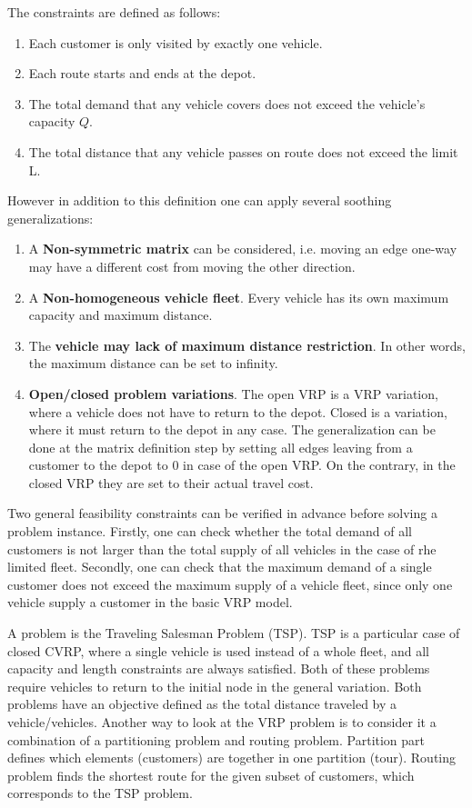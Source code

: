 \documentclass[12pt,a4paper,oneside]{book}
\begin{document}
The constraints are defined as follows:
\begin{enumerate}
\item Each customer is only visited by exactly one vehicle.
\item Each route starts and ends at the depot.
\item The total demand that any vehicle covers does not exceed the vehicle's capacity $Q$.
\item The total distance that any vehicle passes on route does not exceed the limit L. 
\end{enumerate}

However in addition to this definition one can apply several soothing generalizations:

\begin{enumerate}
\item A \textbf{Non-symmetric matrix} can be considered, i.e. moving an edge one-way may have a different cost from moving the other direction.
\item A \textbf{Non-homogeneous vehicle fleet}. Every vehicle has its own maximum capacity and maximum distance.
\item The \textbf{vehicle may lack of maximum distance restriction}. In other words, the maximum distance can be set to infinity.
\item \textbf{Open/closed problem variations}. The open VRP is a VRP variation, where a vehicle does not have to return to the depot. Closed is a variation, where it must return to the depot in any case. The generalization can be done at the matrix definition step by setting all edges leaving from a customer to the depot to 0 in case of the open VRP. On the contrary, in the closed VRP they are set to their actual travel cost.
\end{enumerate}

Two general feasibility constraints can be verified in advance before solving a problem instance. Firstly, one can check whether the total demand of all customers is not larger than the total supply of all vehicles in the case of rhe limited fleet. Secondly, one can check that the maximum demand of a single customer does not exceed the maximum supply of a vehicle fleet, since only one vehicle supply a customer in the basic VRP model.

A problem is the Traveling Salesman Problem (TSP). TSP is a particular case of closed CVRP, where a single vehicle is used instead of a whole fleet, and all capacity and length constraints are always satisfied. Both of these problems require vehicles to return to the initial node in the general variation. Both problems have an objective defined as the total distance traveled by a vehicle/vehicles. Another way to look at the VRP problem is to consider it a combination of a partitioning problem and routing problem. Partition part defines which elements (customers) are together in one partition (tour). Routing problem  finds the shortest route for the given subset of customers, which corresponds to the TSP problem.
\end{document}
